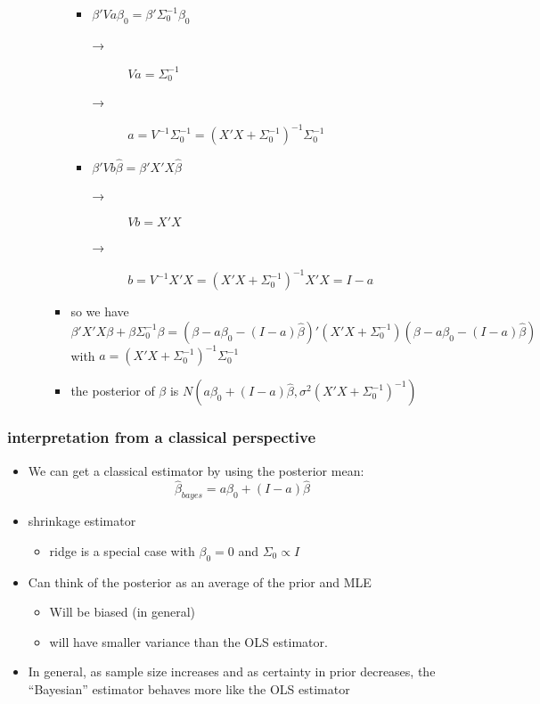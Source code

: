 \documentclass[11pt]{article}
\begin{document}
\begin{itemize}
\begin{itemize}
\begin{itemize}
\begin{itemize}
\item $\beta'V a \beta_0 = \beta'\Sigma_0^{-1}\beta_0$
\begin{description}
\item[→] $V a = \Sigma_0^{-1}$
\item[→] $a = V^{-1} \Sigma_0^{-1} = (X'X + \Sigma_0^{-1})^{-1} \Sigma_0^{-1}$
\end{description}
\item $\beta'V b \hat\beta = \beta'X'X \hat\beta$
\begin{description}
\item[→] $V b = X'X$
\item[→] $b = V^{-1} X'X = (X'X + \Sigma_0^{-1})^{-1} X'X = I -
                a$
\end{description}
\end{itemize}
\item so we have 
            \[\beta'X'X\beta + \beta \Sigma_0^{-1} \beta = (\beta - a
            \beta_0 - (I - a) \hat\beta)'(X'X + \Sigma_0^{-1}) (\beta - a
            \beta_0 - (I - a) \hat\beta)\]
            with $a = (X'X + \Sigma_0^{-1})^{-1}\Sigma_0^{-1}$
\item the posterior of $\beta$ is $N(a \beta_0 + (I - a)\hat\beta,
            \sigma^2 (X'X + \Sigma_0^{-1})^{-1})$
\end{itemize}
\end{itemize}
\end{itemize}
\subsubsection{interpretation from a classical perspective}
\label{sec-4-1-2}

\begin{itemize}
\item We can get a classical estimator by using the posterior mean:
        \[ \hat{\beta}_{bayes} = a \beta_{0} + (I - a)\hat{\beta} \]
\item shrinkage estimator
\begin{itemize}
\item ridge is a special case with $\beta_0 = 0$ and $\Sigma_0 \propto I$
\end{itemize}
\item Can think of the posterior as an average of the prior and MLE
\begin{itemize}
\item Will be biased (in general)
\item will have smaller variance than the OLS estimator.
\end{itemize}
\item In general, as sample size increases and as certainty in
        prior decreases, the ``Bayesian'' estimator behaves more like the
        OLS estimator
\end{itemize}
\end{document}
